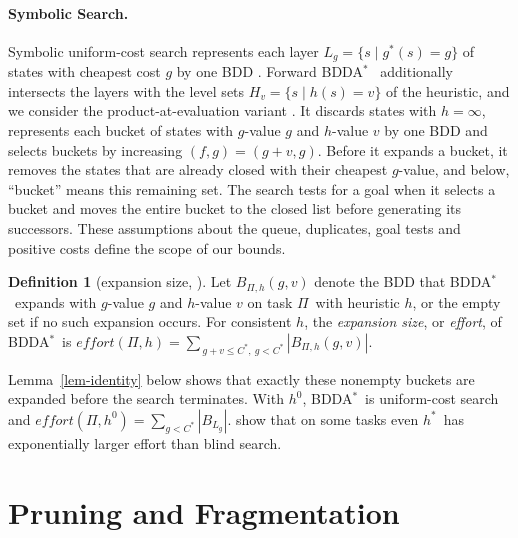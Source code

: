 \documentclass[letterpaper]{article}
\newcommand{\task}{\ensuremath{\Pi}}
\newcommand{\hstar}{\ensuremath{h^{*}}}
\newcommand{\hblind}{\ensuremath{h^{0}}}
\newcommand{\gstar}{\ensuremath{g^{*}}}
\newcommand{\copt}{\ensuremath{C^{*}}}
\newcommand{\bddsize}[1]{\ensuremath{|B_{#1}|}}
\newcommand{\level}[2]{\ensuremath{H_{#2}}}
\newcommand{\effort}{\ensuremath{\mathit{effort}}}
\newcommand{\bddastar}{BDDA\ensuremath{^{*}}}
\theoremstyle{plain}
\theoremstyle{definition}
\newtheorem{definition}{Definition}
\theoremstyle{remark}
\begin{document}
\paragraph{Symbolic Search.}
Symbolic uniform-cost search represents each layer $L_g=\{s\mid\gstar(s)=g\}$ of states with cheapest cost $g$ by one BDD \citep{torralba-et-al-aij2017}.
Forward \bddastar\ \citep{edelkamp-reffel-ki1998} additionally intersects the layers with the level sets $\level{h}{v}=\{s\mid h(s)=v\}$ of the heuristic, and we consider the product-at-evaluation variant \citep{speck-et-al-icaps2020}.
It discards states with $h=\infty$, represents each bucket of states with $g$-value $g$ and $h$-value $v$ by one BDD and selects buckets by increasing $(f,g)=(g+v,g)$.
Before it expands a bucket, it removes the states that are already closed with their cheapest $g$-value, and below, ``bucket'' means this remaining set.
The search tests for a goal when it selects a bucket and moves the entire bucket to the closed list before generating its successors.
These assumptions about the queue, duplicates, goal tests and positive costs define the scope of our bounds.

\begin{definition}[expansion size, \citealp{speck-et-al-icaps2020}]
\label{def-effort}
Let $B_{\task,h}(g,v)$ denote the BDD that \bddastar\ expands with $g$-value $g$ and $h$-value $v$ on task \task\ with heuristic $h$, or the empty set if no such expansion occurs.
For consistent $h$, the \emph{expansion size}, or \emph{effort}, of \bddastar\ is $\effort(\task,h) = \sum_{\,g + v \leq \copt,\ g < \copt} |B_{\task,h}(g,v)|$.
\end{definition}

Lemma~\ref{lem-identity} below shows that exactly these nonempty buckets are expanded before the search terminates.
With $\hblind$, \bddastar\ is uniform-cost search and $\effort(\task,\hblind) = \sum_{g < \copt} \bddsize{L_g}$.
\citet{speck-et-al-icaps2020} show that on some tasks even \hstar\ has exponentially larger effort than blind search.

\section{Pruning and Fragmentation}
\end{document}
